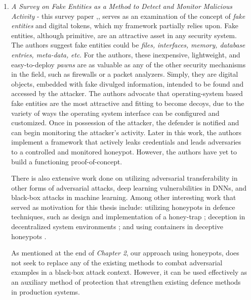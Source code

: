 \documentclass[grad,lot,lof,11pt,oneside,onehalfspace]{RUthesis}
\begin{document}
\begin{enumerate}
	 
	\item \textit{A Survey on Fake Entities as a Method to Detect and Monitor Malicious Activity} - this survey paper ,\cite{rauti_survey_2017}, serves as an examination of the concept of \textit{fake entities} and digital tokens, which my framework partially relies upon. Fake entities, although primitive, are an attractive asset in any security system. The authors suggest fake entities could be \textit{files, interfaces, memory, database entries, meta-data, etc}. For the authors, these inexpensive, lightweight, and easy-to-deploy \textit{pawns} are as valuable as any of the other security mechanisms in the field, such as firewalls or a packet analyzers. Simply, they are digital objects, embedded with fake divulged information, intended to be found and accessed by the attacker. The authors advocate that operating-system based fake entities are the most attractive and fitting to become  decoys, due to the variety of ways the operating system interface can be configured and customized. Once in possession of the attacker, the defender is notified and can begin monitoring the attacker's activity. Later in this work, the authors implement a framework that actively leaks credentials and leads adversaries to a controlled and monitored honeypot. However, the authors have yet to build a functioning proof-of-concept.
	
	There is also extensive work done on utilizing adversarial transferability in other forms of adversarial attacks, deep learning vulnerabilities in DNNs, and black-box attacks in machine learning. Among other interesting work that served as  motivation for this thesis include: utilizing honeypots in defence techniques, such as design and implementation of a honey-trap \cite{egupov_development_2017}; deception in decentralized system environments \cite{soule_enabling_2016}; and using containers in deceptive honeypots \cite{kedrowitsch_first_2017}.
	
    As mentioned at the end of \textit{Chapter 2}, our approach using honeypots, does not seek to replace any of the existing methods to combat adversarial examples in a black-box attack context. However, it can  be used effectively as an auxiliary method of protection that strengthen  existing defence methods in production systems. 
    

    
\end{enumerate}
\end{document}
